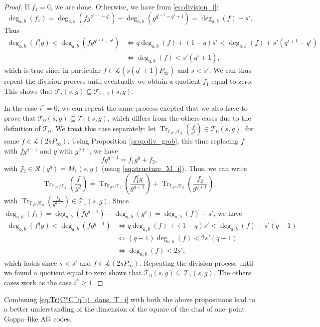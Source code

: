 \documentclass[a4paper]{article}
\theoremstyle{definition}
\theoremstyle{remark}
\newcommand{\calL}{\mathcal{L}}
\newcommand{\calR}{\mathcal{R}}
\newcommand{\calT}{\mathcal{T}}
\newcommand{\fq}{\mathbb{F}_{q}}
\newcommand{\Tr}[1]{\operatorname{Tr}_{\mathbb{F}_{q^m}/\fq}\left(#1\right)}
\newcommand{\degab}[1]{\deg_{a,b}\left(#1\right)}
\begin{document}
\begin{proof}
If $f_1=0$, we are done. Otherwise, we have from \eqref{eq:division_i}:
$$\degab{f_1} = \degab{fg^{q^{i+1}-q^i}} - \degab{g^{q^{i+1}-q^i+1}} = \degab{f}-s'.$$
Thus
\begin{align*}
     \degab{f_1^qg} < \degab{fg^{q^{i+1}-q^i}} & \iff q\degab{f} +(1-q)s' < \degab{f} +s'(q^{i+1}-q^i) \\
                                               & \iff \degab{f} < s'(q^{i}+1),
\end{align*}
which is true since in particular $f \in \calL(s(q^i+1)P_\infty)$ and $s<s'$. We can thus repeat the division process until eventually we obtain a quotient $f_1$ equal to zero. This shows that $\calT_i(s,g) \subseteq \calT_{i+1}(s,g)$.

In the case $i^*=0$, we can repeat the same process exepted that we also have to prove that $\calT_0(s,g) \subseteq \calT_1(s,g)$, which differs from the others cases due to the definition of $\calT_0$. We treat this case separately: let $\Tr{\frac{f}{g^2}} \in \calT_0(s,g)$, for some $f \in \calL(2sP_\infty)$. Using Proposition \ref{prop:div_grob}, this time replacing $f$ with $fg^{q-1}$ and $g$ with $g^{q+1}$, we have
$$fg^{q-1} = f_1g^q + f_2,$$ with $f_2 \in \calR(g^q) = M_1(s,g)$ (using \eqref{eq:structure_M_i}).
Thus, we can write
    $$ \Tr{\frac{f}{g^2}} = \Tr{\frac{f_1^qg}{g^{q+1}}}  + \Tr{\frac{f_2}{g^{q+1}}}, $$
with $\Tr{\frac{f_2}{g^{q+1}}} \in \calT_1(s,g)$. Since $\degab{f_1} = \degab{fg^{q-1}} - \degab{g^q} = \degab{f}-s'$, we have 
\begin{align*}
     \degab{f_1^qg} < \degab{fg^{q-1}} & \iff q\degab{f} +(1-q)s' < \degab{f} + s'(q-1)\\
                                               & \iff (q-1)\degab{f} < 2s'(q-1)\\
                                               & \iff \degab{f} < 2s',
\end{align*}
which holds since $s<s'$ and $f \in \calL(2sP_\infty)$. Repeating the division process until we found a quotient equal to zero shows that $\calT_0(s,g) \subseteq \calT_1(s,g)$. The others cases work as the case $i^* \geq 1$.
\end{proof}

Combining \eqref{eq:Tr(C*C^q^i)_dans_T_i} with both the above propositions lead to a better understanding of the dimension of the square of the dual of one--point Goppa--like AG codes. 
\end{document}
